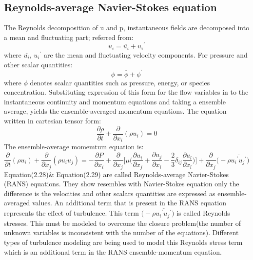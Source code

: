 \subsection{Reynolds-average Navier-Stokes equation}
The Reynolds decomposition of u and p, instantaneous fields are decomposed into a mean and fluctuating part; referred from\cite{pope2000,ANSYS}:
\begin{equation}
{u_i}={\overline{u_i}}+{{u_i}^\prime}
\end{equation}
where ${\overline{u_i}}$, ${{u_i}^\prime}$ are the mean and fluctuating velocity components.
For pressure and other scalar quantities:
\begin{equation}
\phi ={\overline{\phi}}+{{\phi}^\prime}
\end{equation}
where $\phi$ denotes scalar quantities such as pressure, energy, or species concentration.
Substituting expression of this form for the flow variables in to the instantaneous continuity and momentum equations and taking a ensemble average, yields the ensemble-averaged momentum equations. The equation 
written in cartesian tensor form:
\begin{equation}
{{\frac{\partial \rho}{\partial t}}+{\frac{\partial}{\partial {x_i}}}(\rho u_i)}=0
\end{equation}
The ensemble-average momemtum equation is:
\begin{equation}
{{{\frac{\partial}{\partial t}}(\rho u_i)}+{{\frac{\partial}{\partial x_j}}(\rho{u_i}{u_j})}}={-{\frac{\partial P}{\partial x_i}}+{\frac{\partial}{\partial x_j}}{\Bigg[{\mu}\Bigg({{{\frac{\partial u_i}
{\partial x_j}}+{\frac{\partial u_j}{\partial x_i}}-{\frac{2}{3}}{{\delta}_{ij}}{\frac{\partial u_l}{\partial x_l}}}}\Bigg)\Bigg]+{\frac{\partial}{\partial x_j}}\bigg({-}{\rho}{\overline{{{u_i}^\prime}{{u_j}^\prime}}}\bigg)}}
\end{equation}
 Equation(2.28)$\&$ Equation(2.29) are called Reynolds-average Navier-Stokes (RANS) equations. They show resembles with Navier-Stokes equation only the difference is the velocities and other scalars 
quantities are expressed as ensemble-averaged values. An additional term that is present in the RANS equation represents the effect of turbulence. This term $\bigg({-}{\rho}{\overline{{{u_i}^\prime}{{u_j}^\prime}}}\bigg)$
is called Reynolds stresses. This must be modeled to overcome the closure problem(the number of unknown variables is inconsistent with the number of the equations). Different types of turbulence modeling are being used to model this Reynolds stress term which 
is an additional term in the RANS ensemble-momentum equation.

